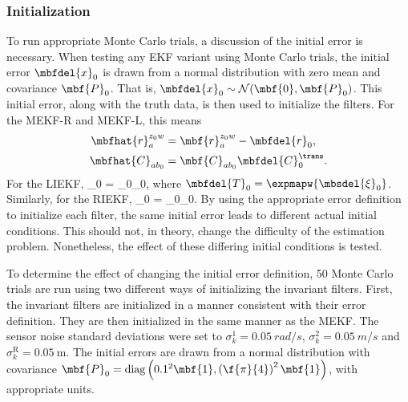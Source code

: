 \subsubsection{Initialization}

To run appropriate Monte Carlo trials, a discussion of the initial error is necessary. When testing any EKF variant using Monte Carlo trials, the initial error $\mbfdel{x}_0$ is drawn from a normal distribution with zero mean and covariance $\mbf{P}_0$. That is, $\mbfdel{x}_0 \sim \mathcal{N}(\mbf{0},\mbf{P}_0)$. This initial error, along with the truth data, is then used to initialize the filters. For the MEKF-R and MEKF-L, this means
\begin{align*}
	\mbfhat{r}_a^{z_0w} &= \mbf{r}_a^{z_0w} - \mbfdel{r}_0, \\
	\mbfhat{C}_{ab_0} &= \mbf{C}_{ab_0}\mbfdel{C}_0^\trans. 
\end{align*}
For the LIEKF, 
\bdis
	_0 = _0_0,    
\edis
where $\mbfdel{T}_0 = \expmapw{\mbsdel{\xi}_0}$. Similarly, for the RIEKF,
\bdis
	_0 = _0_0.  
\edis
By using the appropriate error definition to initialize each filter, the same initial error leads to different actual initial conditions. This should not, in theory, change the difficulty of the estimation problem. Nonetheless, the effect of these differing initial conditions is tested. 

To determine the effect of changing the initial error definition, 50 Monte Carlo trials are run using two different ways of initializing the invariant filters. First, the invariant filters are initialized in a manner consistent with their error definition. They are then initialized in the same manner as the MEKF. The sensor noise standard deviations were set to $\sigma_k^1 = \SI{0.05}{rad/s}$, $\sigma_k^2 = \SI{0.05}{m/s}$ and $\sigma_k^\mathrm{R} = \SI{0.05}{\metre}$. The initial errors are drawn from a normal distribution with covariance $\mbf{P}_0 = \mathrm{diag}\left(0.1^2 \mbf{1}, \left(\f{\pi}{4}\right)^2\mbf{1}\right)$, with appropriate units. 

